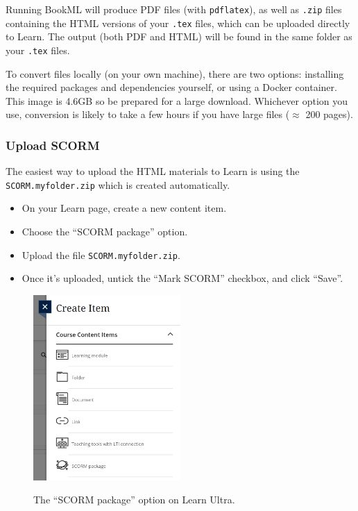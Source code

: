 Running BookML will produce PDF files (with \verb|pdflatex|), as well as \verb|.zip| files containing the HTML versions of your \verb|.tex| files, which can be uploaded directly to Learn. The output (both PDF and HTML) will be found in the same folder as your \verb|.tex| files.

To convert files locally (on your own machine), there are two options: installing the required packages and dependencies yourself, or using a Docker container. 
This image is 4.6GB so be prepared for a large download.
Whichever option you use, conversion is likely to take a few hours if you have large files (\(\approx\) 200 pages). 



\subsubsection{Upload SCORM}
\label{ssec:scorm}

The easiest way to upload the HTML materials to Learn is using the \verb|SCORM.myfolder.zip| which is created automatically.

\begin{itemize}
    \item On your Learn page, create a new content item.
    \item Choose the ``SCORM package'' option.
    \item Upload the file \verb|SCORM.myfolder.zip|.
    \item Once it's uploaded, untick the ``Mark SCORM'' checkbox, and click ``Save''.
\end{itemize}

\begin{figure}[h!]
    \centering
    \includegraphics[width=0.5\textwidth, alt={A screenshot of the ``Create content'' menu on Learn Ultra showing different options. The last option is ``SCORM package''.}]{img/scorm.png}
    \caption{The ``SCORM package'' option on Learn Ultra.}
    \label{fig:scorm}
\end{figure}
 


